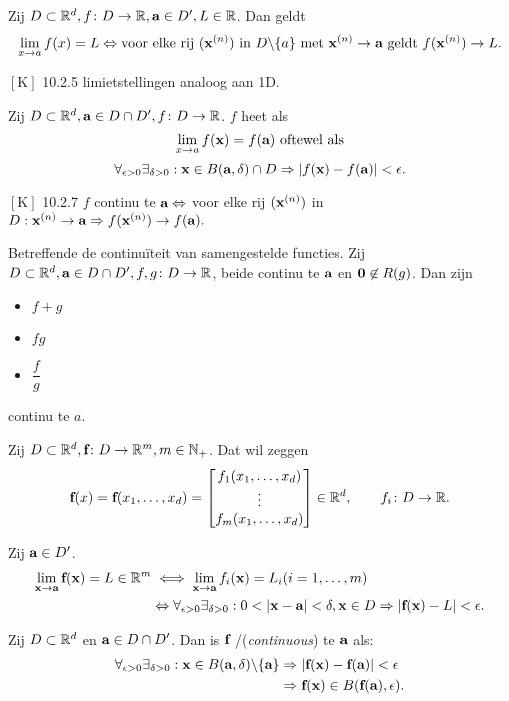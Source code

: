 \documentclass{2wa40summary}
\begin{document}
	\theorem Zij $D \subset \mathbb{R}^d, f\colon D\to \mathbb{R}, {\textbf{a}} \in D', L \in \mathbb{R}$. Dan geldt
	\[ \lim_{x \to a} f(x)=L \Leftrightarrow \text{voor elke rij } ({\textbf{x}}^{(n)}) \text{ in } D\backslash\{a\} \text{ met } {\textbf{x}}^{(n)}\to {\textbf{a}} \text{ geldt } f({\textbf{x}}^{(n)}) \to L.\]
	
	\opm $\left[\text{K}\right]$ 10.2.5 limietstellingen analoog aan 1D.
	
	 Zij $D \subset \mathbb{R}^d, {\textbf{a}}\in D\cap D',f\colon D\to \mathbb{R}$. $f$ heet  als \[\lim_{x\to a}f({\textbf{x}})=f({\textbf{a}}) \text{ oftewel als}\]
	\[\forall _{\epsilon >0} \exists _{\delta >0}: \x \in B(\a,\delta)\cap D \Rightarrow |f(\x)-f(\a)|<\epsilon.\]
	
	\theorem $\left[\text{K}\right]$ 10.2.7
	$f$ continu te ${\textbf{a}}\Leftrightarrow$ voor elke rij $({\textbf{x}}^{(n)})$ in $D: {\textbf{x}}^{(n)}\to {\textbf{a}} \Rightarrow f({\textbf{x}}^{(n)}) \to f({\textbf{a}}).$
	
	\theorem Betreffende de continu\"iteit van samengestelde functies. Zij
	$D \subset \mathbb{R}^d, {\textbf{a}} \in D\cap D', f,g\colon D\to \mathbb{R}$, beide continu te ${\textbf{a}}$ en ${\textbf{0}} \not \in R(g)$.
	Dan zijn
	\begin{itemize}
		\item $f+g$
		\item $fg$
		\item $\dfrac{f}{g}$
	\end{itemize}
	continu te $a$.
	
	Zij $D \subset \mathbb{R}^d, {\textbf{f}}\colon D\to \mathbb{R}^m, m \in \mathbb{N}_+$. Dat wil zeggen
	\[{\textbf{f}}(x)={\textbf{f}}(x_1,\dots , x_d) =
	\begin{bmatrix}
	f_1(x_1,\dots , x_d) \\
	\vdots \\
	f_m(x_1,\dots , x_d) \\
	\end{bmatrix}\in\mathbb{R}^d, \qquad f_i\colon D\to \mathbb{R}.\]
	
	 Zij ${\textbf{a}} \in D'$.
	\begin{align*}
	\lim_{\x\to\a}\f(\x)=L \in \reals^m  &\iff \lim_{\x\to\a}f_i(\x)=L_i (i=1,\ldots ,m) \\
	&\Leftrightarrow \forall _{\epsilon >0} \exists _{\delta >0}: 0<|\x-\a|<\delta, \x\in D \Rightarrow \abs{\f(\x)-L}<\epsilon.
	\end{align*}
	
	 Zij $D \subset \mathbb{R}^d$ en ${\textbf{a}} \in D \cap D'$.
	Dan is ${\textbf{f}}$ /(\textit{continuous}) te ${\textbf{a}}$ als:
	\begin{align*}
	\forall _{\epsilon >0} \exists _{\delta >0}: \x\in B(\a,\delta)\backslash\set{\a} &\Rightarrow |\f(\x)-\f(\a)|<\epsilon \\
	&\Rightarrow \f(\x) \in B(\f(\a),\epsilon).
	\end{align*}
	
\end{document}
